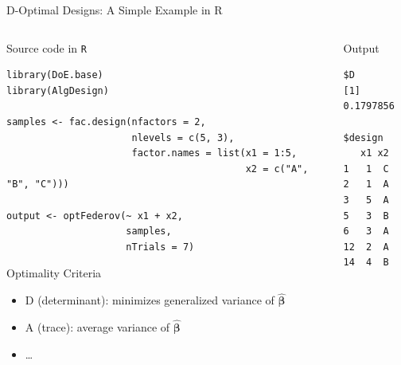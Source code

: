 \documentclass[10pt, compress, aspectratio=169, xcolor={table,usenames,dvipsnames}]{beamer}
\begin{document}
\begin{frame}[label={sec:org757a939},fragile]{D-Optimal Designs: A Simple Example in R}
 \begin{columns}
\begin{column}{0.7\columnwidth}
\begin{block}{Source code in \texttt{R}}
\vspace{-.2cm}

\lstset{language=r,label= ,caption= ,captionpos=b,numbers=none}
\begin{lstlisting}
library(DoE.base)
library(AlgDesign)

samples <- fac.design(nfactors = 2,
                      nlevels = c(5, 3),
                      factor.names = list(x1 = 1:5,
                                          x2 = c("A", "B", "C")))

output <- optFederov(~ x1 + x2,
                     samples,
                     nTrials = 7)
\end{lstlisting}

\begin{block}{Optimality Criteria}
\begin{itemize}
\item \alert{D} (determinant): minimizes generalized variance of \(\bm{\hat{\beta}}\)
\item \alert{A} (trace): average variance of \(\bm{\hat{\beta}}\)
\item \dots{}
\end{itemize}
\end{block}
\end{block}
\end{column}


\begin{column}{0.3\columnwidth}
\begin{block}{Output}
\vspace{-.2cm}
\scriptsize

\begin{verbatim}
$D
[1] 0.1797856

$design
   x1 x2
1   1  C
2   1  A
3   5  A
5   3  B
6   3  A
12  2  A
14  4  B
\end{verbatim}


\normalsize
\end{block}
\end{column}
\end{columns}
\end{frame}
\end{document}
